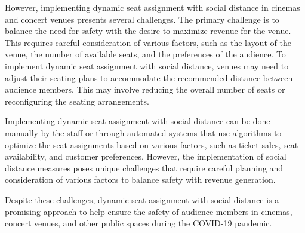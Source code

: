 However, implementing dynamic seat assignment with social distance in cinemas and concert venues presents several challenges. The primary challenge is to balance the need for safety with the desire to maximize revenue for the venue. This requires careful consideration of various factors, such as the layout of the venue, the number of available seats, and the preferences of the audience. To implement dynamic seat assignment with social distance, venues may need to adjust their seating plans to accommodate the recommended distance between audience members. This may involve reducing the overall number of seats or reconfiguring the seating arrangements.

Implementing dynamic seat assignment with social distance can be done manually by the staff or through automated systems that use algorithms to optimize the seat assignments based on various factors, such as ticket sales, seat availability, and customer preferences. However, the implementation of social distance measures poses unique challenges that require careful planning and consideration of various factors to balance safety with revenue generation.

Despite these challenges, dynamic seat assignment with social distance is a promising approach to help ensure the safety of audience members in cinemas, concert venues, and other public spaces during the COVID-19 pandemic.















\newpage
